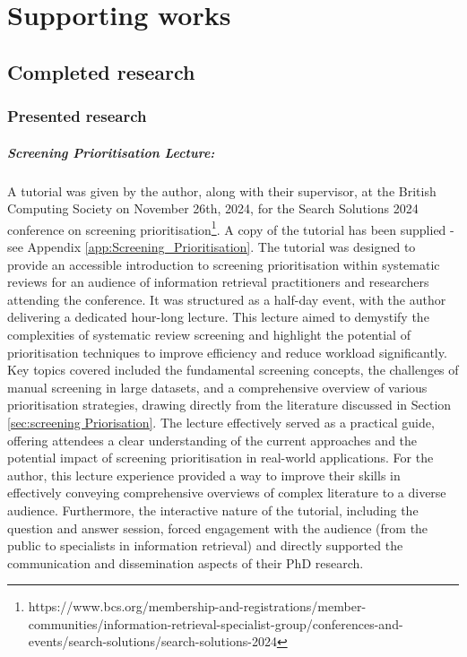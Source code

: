 \documentclass[10pt,oneside]{book}
\begin{document}
\chapter{Supporting works}
\section{Completed research}

\subsection{Presented research}

\paragraph{Screening Prioritisation Lecture: } A tutorial was given by the author, along with their supervisor, at the British Computing Society on November 26th, 2024, for the Search Solutions 2024 conference on screening prioritisation\footnote{https://www.bcs.org/membership-and-registrations/member-communities/information-retrieval-specialist-group/conferences-and-events/search-solutions/search-solutions-2024}. A copy of the tutorial has been supplied - see Appendix \ref{app:Screening_Prioritisation}. The tutorial was designed to provide an accessible introduction to screening prioritisation within systematic reviews for an audience of information retrieval practitioners and researchers attending the conference. It was structured as a half-day event, with the author delivering a dedicated hour-long lecture. This lecture aimed to demystify the complexities of systematic review screening and highlight the potential of prioritisation techniques to improve efficiency and reduce workload significantly. Key topics covered included the fundamental screening concepts, the challenges of manual screening in large datasets, and a comprehensive overview of various prioritisation strategies, drawing directly from the literature discussed in Section \ref{sec:screening Priorisation}. The lecture effectively served as a practical guide, offering attendees a clear understanding of the current approaches and the potential impact of screening prioritisation in real-world applications. For the author, this lecture experience provided a way to improve their skills in effectively conveying comprehensive overviews of complex literature to a diverse audience. Furthermore, the interactive nature of the tutorial, including the question and answer session, forced engagement with the audience (from the public to specialists in information retrieval) and directly supported the communication and dissemination aspects of their PhD research.
\end{document}
